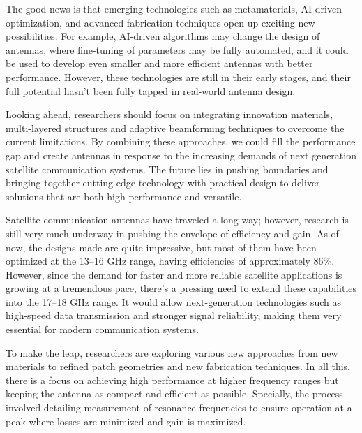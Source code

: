\documentclass[12pt]{article}
\begin{document}
\par The good news is that emerging technologies such as metamaterials, AI-driven optimization, and advanced fabrication techniques open up exciting new possibilities. For example, AI-driven algorithms may change the design of antennas, where fine-tuning of parameters may be fully automated, and it could be used to develop even smaller and more efficient antennas with better performance. However, these technologies are still in their early stages, and their full potential hasn't been fully tapped in real-world antenna design.\\

\par Looking ahead, researchers should focus on integrating innovation materials, multi-layered structures and adaptive beamforming techniques to overcome the current limitations. By combining these approaches, we could fill the performance gap and create antennas in response to the increasing demands of next generation satellite communication systems. The future lies in pushing boundaries and bringing together cutting-edge technology with practical design to deliver solutions that are both high-performance and versatile.\\

\par Satellite communication antennas have traveled a long way; however, research is still very much underway in pushing the envelope of efficiency and gain. As of now, the designs made are quite impressive, but most of them have been optimized at the 13–16 GHz range, having efficiencies of approximately 86\%. However, since the demand for faster and more reliable satellite applications is growing at a tremendous pace, there's a pressing need to extend these capabilities into the 17–18 GHz range. It would allow next-generation technologies such as high-speed data transmission and stronger signal reliability, making them very essential for modern communication systems.\\

\newpage
\par To make the leap, researchers are exploring various new approaches from new materials to refined patch geometries and new fabrication techniques. In all this, there is a focus on achieving high performance at higher frequency ranges but keeping the antenna as compact and efficient as possible. Specially, the process involved detailing measurement of resonance frequencies to ensure operation at a peak where losses are minimized and gain is maximized.\\
\end{document}
